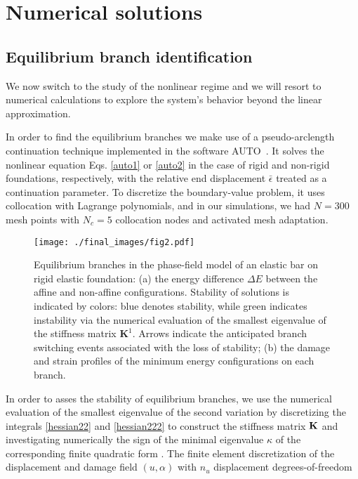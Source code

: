 
\section{Numerical solutions}
\label{sec:numerics}
\subsection{Equilibrium branch identification}

We now switch to the study of  the nonlinear regime  and we will resort to numerical calculations  to explore the system's behavior beyond the linear approximation.

In order to find the equilibrium branches we make use of a pseudo-arclength continuation technique implemented in the software AUTO~\cite{Doedel1981-sa}. It solves the nonlinear equation Eqs. \ref{auto1} or  \ref{auto2} in the case of rigid and non-rigid foundations, respectively, with the relative end displacement $\bar\epsilon$ treated as a continuation parameter. To discretize the boundary-value problem, it uses collocation with Lagrange polynomials, and in our simulations, we had $N=300$ mesh points with $N_c = 5$ collocation nodes and activated mesh adaptation. 
\begin{figure}
\texttt{[image: ./final\_images/fig2.pdf]}
    \caption{
Equilibrium branches in the phase-field model of an elastic bar on rigid elastic foundation: (a) the energy difference $\Delta E$ between the affine and non-affine configurations. Stability of solutions is indicated by colors: blue denotes stability, while green indicates instability   via the numerical evaluation of the smallest eigenvalue of the stiffness matrix $\mathbf{K}^1$. Arrows indicate the anticipated branch switching events associated with the loss of stability; (b) the damage and strain profiles of the minimum energy configurations on each branch.}
    \label{fig:enter-label}
\end{figure}
In order to asses the stability of equilibrium branches, we use  the numerical evaluation of the smallest eigenvalue of the second variation by discretizing the integrals \eqref{hessian22} and   \eqref{hessian222} to construct the stiffness matrix
${\bf K}$ and investigating numerically the sign of the minimal eigenvalue $\kappa$ of the corresponding finite quadratic form \cite{Sanderson2016-ht}.  The finite element discretization of the displacement and damage field $(u, \alpha )$     with \( n_u \) displacement degrees-of-freedom 
